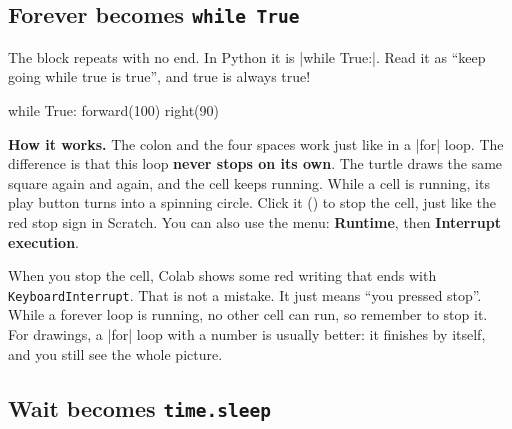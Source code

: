 \subsection*{Forever becomes \texttt{while True}}

The  block repeats with no end. In Python it is \py|while True:|. Read it as ``keep going while true is true'', and true is always true!

\begin{tcbraster}[raster columns=2, raster equal height=rows, raster column skip=12pt, raster valign=center]
\begin{tcolorbox}[colback=white, colframe=white, boxrule=0pt, valign=center]
\begin{scratch}[scale=0.85]
\end{scratch}
\end{tcolorbox}
\begin{code}
while True:
    forward(100)
    right(90)
\end{code}
\end{tcbraster}

\textbf{How it works.} The colon and the four spaces work just like in a \py|for| loop. The difference is that this loop \textbf{never stops on its own}. The turtle draws the same square again and again, and the cell keeps running. While a cell is running, its play button turns into a spinning circle. Click it (\stopbtn) to stop the cell, just like the red stop sign in Scratch. You can also use the menu: \textbf{Runtime}, then \textbf{Interrupt execution}.

\begin{watchout}
When you stop the cell, Colab shows some red writing that ends with \texttt{KeyboardInterrupt}. That is not a mistake. It just means ``you pressed stop''. While a forever loop is running, no other cell can run, so remember to stop it. For drawings, a \py|for| loop with a number is usually better: it finishes by itself, and you still see the whole picture.
\end{watchout}

\subsection*{Wait becomes \texttt{time.sleep}}

